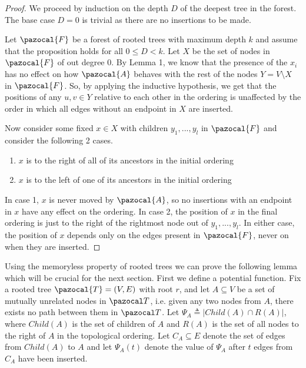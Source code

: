 \documentclass{article}
\begin{document}
\begin{proof}
We proceed by induction on the depth $D$ of the deepest tree in the forest. The base case $D=0$ is trivial as there are no insertions to be made.

Let $\pazocal{F}$ be a forest of rooted trees with maximum depth $k$ and assume that the proposition holds for all $0 \leq D < k$. Let $X$ be the set of nodes in $\pazocal{F}$ of out degree 0. By Lemma 1, we know that the presence of the $x_i$ has no effect on how $\pazocal{A}$ behaves with the rest of the nodes $Y = V \setminus X$ in $\pazocal{F}$. So, by applying the inductive hypothesis, we get that the positions of any $u,v \in Y$ relative to each other in the ordering is unaffected by the order in which all edges without an endpoint in $X$ are inserted.

Now consider some fixed $x \in X$ with children $y_1,...,y_l$ in $\pazocal{F}$ and consider the following 2 cases.

\begin{enumerate}
    \item $x$ is to the right of all of its ancestors in the initial ordering
    \item $x$ is to the left of one of its ancestors in the initial ordering
\end{enumerate}

In case 1, $x$ is never moved by $\pazocal{A}$, so no insertions with an endpoint in $x$ have any effect on the ordering. In case 2, the position of $x$ in the final ordering is just to the right of the rightmost node out of $y_1,...,y_l$. In either case, the position of $x$ depends only on the edges present in $\pazocal{F}$, never on when they are inserted.
\end{proof}

Using the memoryless property of rooted trees we can prove the following lemma which will be crucial for the next section. First we define a potential function. Fix a rooted tree $\pazocal{T} = (V,E)$ with root $r$, and let $A \subseteq V$ be a set of mutually unrelated nodes in $\pazocal T$, i.e. given any two nodes from $A$, there exists no path between them in $\pazocal T$. Let $\Psi_A \triangleq \vert Child(A) \cap R(A) \vert$, where $Child(A)$ is the set of children of $A$ and $R(A)$ is the set of all nodes to the right of $A$ in the topological ordering. Let $C_A \subseteq E$ denote the set of edges from $Child(A)$ to $A$ and let $\Psi_A(t)$ denote the value of $\Psi_A$ after $t$ edges from $C_A$ have been inserted.
\end{document}
